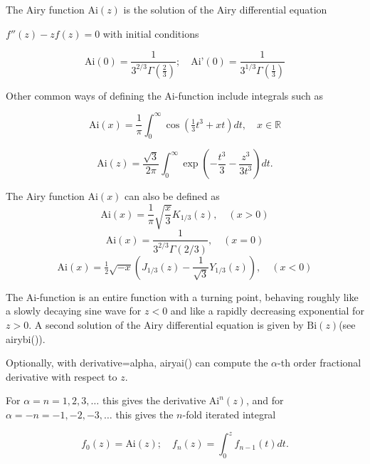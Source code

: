 \vpara
The Airy function $\text{Ai}(z)$ is the solution of the Airy differential equation 

$f''(z)-z f(z)=0$ with initial conditions

\begin{equation}
\text{Ai}(0)=\frac{1}{3^{2/3}\Gamma\left(\frac{2}{3}\right)}; \quad \text{Ai'}(0)=\frac{1}{3^{1/3}\Gamma\left(\frac{1}{3}\right)}
\end{equation}

Other common ways of defining the Ai-function include integrals such as

\begin{equation}
\text{Ai}(x)= \frac{1}{\pi} \int_0^{\infty} \cos\left(\tfrac{1}{3}t^3 + xt \right) dt, \quad x \in \mathbb{R}
\end{equation}

\begin{equation}
\text{Ai}(z)= \frac{\sqrt{3}}{2\pi} \int_0^{\infty} \exp\left(-\frac{t^3}{3}-\frac{z^3}{3t^3} \right) dt.
\end{equation}


\vspace{0.3cm}
The Airy function $\text{Ai}(x)$ can also be defined as
\begin{equation}
\text{Ai}(x) = \frac{1}{\pi} \sqrt{\frac{x}{3}} K_{1/3}(z), \quad (x>0)
\end{equation}
\begin{equation}
\text{Ai}(x) = \frac{1}{3^{2/3}\Gamma(2/3)} , \quad (x=0)
\end{equation}
\begin{equation}
\text{Ai}(x) = \tfrac{1}{2} \sqrt{-x} \left(J_{1/3}(z) - \frac{1}{\sqrt{3}} Y_{1/3}(z) \right), \quad (x<0)
\end{equation}



The Ai-function is an entire function with a turning point, behaving roughly like a slowly decaying sine wave for $z<0$ and like a rapidly decreasing exponential for $z>0$. A second solution of the Airy differential equation is given by $\text{Bi}(z)$(see airybi()).

\vpara
Optionally, with derivative=alpha, airyai() can compute the $\alpha$-th order fractional derivative with respect to $z$. 

For $\alpha=n=1,2,3,\ldots$ this gives the derivative $\text{Ai}^{n}(z)$, and for $\alpha=-n=-1,-2,-3,\ldots$ this gives the $n$-fold iterated integral 

\begin{equation}
f_0(z)=\text{Ai}(z); \quad f_n(z) = \int_0^z f_{n-1}(t) dt.
\end{equation}

